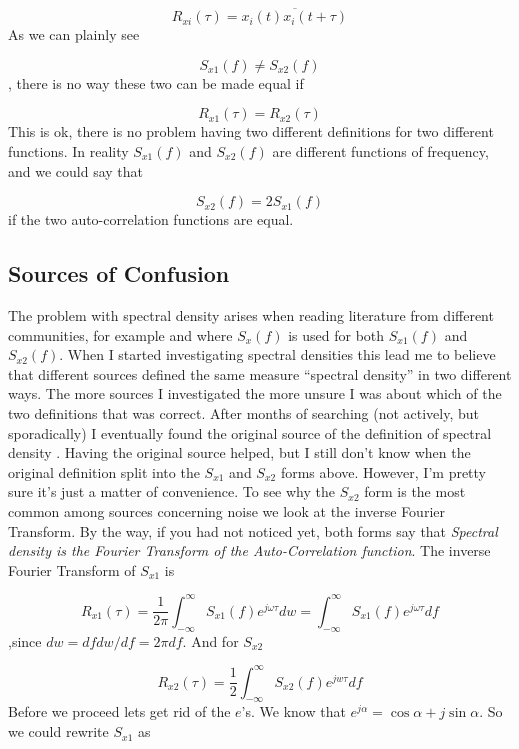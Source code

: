 \[R_{xi}(\tau) = \overline{x_i(t)x_i(t+\tau)}\] As we can plainly see

\[S_{x1}(f) \neq S_{x2}(f)\] , there is no way these two can be made
equal if

\[R_{x1}(\tau) = R_{x2}(\tau)\] This is ok, there is no problem having
two different definitions for two different functions. In reality
\(S_{x1}(f)\) and \(S_{x2}(f)\) are different functions of frequency,
and we could say that

\[S_{x2}(f) = 2S_{x1}(f)\] if the two auto-correlation functions are
equal.

\subsection{Sources of Confusion}\label{sources-of-confusion}

The problem with spectral density arises when reading literature from
different communities, for example  and
 where \(S_x(f)\) is used for both
\(S_{x1}(f)\) and \(S_{x2}(f)\). When I started investigating spectral
densities this lead me to believe that different sources defined the
same measure ``spectral density'' in two different ways. The more
sources I investigated the more unsure I was about which of the two
definitions that was correct. After months of searching (not actively,
but sporadically) I eventually found the original source of the
definition of spectral density .
Having the original source helped, but I still don't know when the
original definition split into the \(S_{x1}\) and \(S_{x2}\) forms
above. However, I'm pretty sure it's just a matter of convenience. To
see why the \(S_{x2}\) form is the most common among sources concerning
noise we look at the inverse Fourier Transform. By the way, if you had
not noticed yet, both forms say that \emph{Spectral density is the
Fourier Transform of the Auto-Correlation function}. The inverse Fourier
Transform of \(S_{x1}\) is

\[R_{x1}(\tau) = \frac{1}{2\pi}\int_{-\infty}^{\infty}{S_{x1}(f)e^{j\omega\tau}dw} = \int_{-\infty}^{\infty}{S_{x1}(f)e^{j\omega\tau}df}\]
,since \(dw = df dw/df = 2\pi df\). And for \(S_{x2}\)

\[R_{x2}(\tau) = \frac{1}{2}\int_{-\infty}^{\infty}{S_{x2}(f)e^{jw\tau}df}\]
Before we proceed lets get rid of the \(e\)'s. We know that
\(e^{j\alpha} =
\cos \alpha + j \sin \alpha\). So we could rewrite \(S_{x1}\) as

